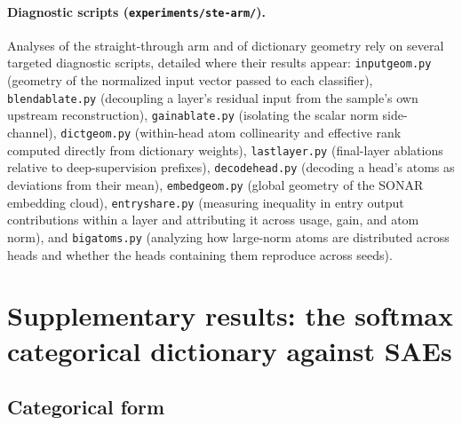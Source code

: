 \paragraph{Diagnostic scripts (\texttt{experiments/\allowbreak ste-arm/}).}
Analyses of the straight-through arm and of dictionary geometry rely on
several targeted diagnostic scripts, detailed where their results appear:
\texttt{inputgeom.py} (geometry of the normalized input vector passed to
each classifier), \texttt{blendablate.py} (decoupling a layer's residual
input from the sample's own upstream reconstruction),
\texttt{gainablate.py} (isolating the scalar norm side-channel),
\texttt{dictgeom.py} (within-head atom collinearity and effective rank
computed directly from dictionary weights), \texttt{lastlayer.py}
(final-layer ablations relative to deep-supervision prefixes),
\texttt{decodehead.py} (decoding a head's atoms as deviations from their
mean), \texttt{embedgeom.py} (global geometry of the SONAR embedding
cloud), \texttt{entryshare.py} (measuring inequality in entry output
contributions within a layer and attributing it across usage, gain, and
atom norm), and \texttt{bigatoms.py} (analyzing how large-norm atoms are
distributed across heads and whether the heads containing them reproduce
across seeds).

\section{Supplementary results: the softmax categorical dictionary against SAEs}
\label{app:soft}

\subsection{Categorical form}
\label{sec:categorical}


